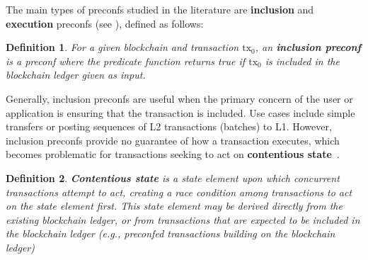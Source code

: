 \documentclass[a4paper]{article}
\theoremstyle{boldstyle}
\newtheorem{definitionx}{Definition}
\newenvironment{definition}
  {\begin{defopenboxq}\begin{definitionx}}
  {\end{definitionx}\end{defopenboxq}}
\newcommand{\ks}[1]{\textcolor{purple}{\textbf{Katerina:} #1}}
\begin{document}
    
    The main types of preconfs studied in the literature are \textbf{inclusion} and \textbf{execution} preconfs (see \cite{W:PreconfirmationsGlossaryRequirements,W:PreconfirmationsforVanillaBasedRollups,W:APricingModelforInclusionPreconfirmations,W:AnalysingExpectedProposerRevenuefromPreconfirmations}), defined as follows:   
    
        \begin{definition}
        For a given blockchain and transaction $\mathrm{tx_0}$, an \textbf{inclusion preconf} is a preconf where the predicate function returns true if $\mathrm{tx_0}$ is included in the blockchain ledger given as input.
        \end{definition}        
        Generally, inclusion preconfs are useful when the primary concern of the user or application is ensuring that the transaction is included. Use cases include simple transfers or posting sequences of L2 transactions (batches) to L1.  
        However, inclusion preconfs provide no guarantee of how a transaction executes, which becomes problematic for transactions seeking to act on \textbf{contentious state}~\cite{W:AnalysingExpectedProposerRevenuefromPreconfirmations,W:APricingModelforInclusionPreconfirmations}. 
        \begin{definition}
        \label{def:contentious state}
        \textbf{Contentious state} is a state element upon which concurrent transactions attempt to act, creating a race condition among transactions to act on the state element first. This state element may be derived directly from the existing blockchain ledger, or from transactions that are expected to be included in the blockchain ledger (e.g., preconfed transactions building on the blockchain ledger)  \end{definition}
        
\end{document}
